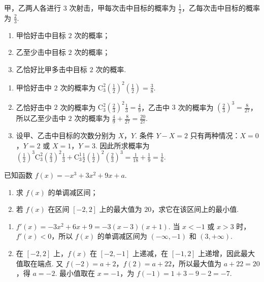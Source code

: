 \begin{problem}
甲，乙两人各进行 \(3\) 次射击，甲每次击中目标的概率为 \(\frac{1}{2}\)，乙每次击中目标的概率为 \(\frac{2}{3}\).

\begin{enumerate}
\item 甲恰好击中目标 \(2\) 次的概率；
\item 乙至少击中目标 \(2\) 次的概率；
\item 乙恰好比甲多击中目标 \(2\) 次的概率.
\end{enumerate}
\end{problem}

\begin{solution}
\begin{enumerate}
\item 甲恰好击中 \(2\) 次的概率为 \(\mathrm C_3^2\left(\frac12\right)^2\left(\frac12\right)=\frac38\).
\item 乙恰好击中 \(2\) 次的概率为 \(\mathrm C_3^2\left(\frac23\right)^2\frac13=\frac49\)，乙击中 \(3\) 次的概率为 \(\left(\frac23\right)^3=\frac{8}{27}\)，所以乙至少击中 \(2\) 次的概率为 \(\frac49+\frac{8}{27}=\frac{20}{27}\).
\item 设甲、乙击中目标的次数分别为 \(X\)，\(Y\). 条件 \(Y-X=2\) 只有两种情况：\(X=0\)，\(Y=2\) 或 \(X=1\)，\(Y=3\). 因此所求概率为 \(\left(\frac12\right)^3\mathrm C_3^2\left(\frac23\right)^2\frac13+\mathrm C_3^1\frac12\left(\frac12\right)^2\left(\frac23\right)^3=\frac1{18}+\frac19=\frac16\).
\end{enumerate}
\end{solution}

\begin{problem}
已知函数 \(f(x)=-x^3+3x^2+9x+a\).

\begin{enumerate}
\item 求 \(f(x)\) 的单调减区间；
\item 若 \(f(x)\) 在区间 \([-2,2]\) 上的最大值为 \(20\)，求它在该区间上的最小值.
\end{enumerate}
\end{problem}

\begin{solution}
\begin{enumerate}
\item \(f'(x)=-3x^2+6x+9=-3(x-3)(x+1)\). 当 \(x<-1\) 或 \(x>3\) 时，\(f'(x)<0\)，所以 \(f(x)\) 的单调减区间为 \((-\infty,-1)\) 和 \((3,+\infty)\).
\item 在 \([-2,2]\) 上，\(f(x)\) 在 \([-2,-1]\) 上递减，在 \([-1,2]\) 上递增，因此最大值取在端点. 又 \(f(-2)=a+2\)，\(f(2)=a+22\)，所以最大值为 \(a+22=20\)，得 \(a=-2\). 最小值取在 \(x=-1\)，为 \(f(-1)=1+3-9-2=-7\).
\end{enumerate}
\end{solution}

